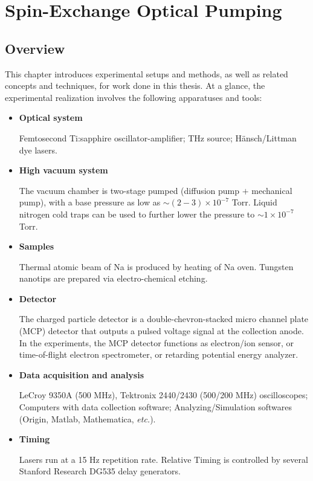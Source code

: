 \chapter{Spin-Exchange Optical Pumping}
\label{chap2}

\section{Overview}

This chapter introduces experimental setups and methods, as well as related concepts and techniques, for work done in this thesis. At a glance, the experimental realization involves the following apparatuses and tools:

\begin{itemize}[noitemsep,topsep=0pt]
	
    \item {\bf Optical system} 
    
    Femtosecond Ti:sapphire oscillator-amplifier; THz source; H\"{a}nsch/Littman dye lasers.
    
	\item {\bf High vacuum system}
	
	The vacuum chamber is two-stage pumped (diffusion pump $+$ mechanical pump), with a base pressure as low as $\sim (2-3) \times 10^{-7}$ Torr. Liquid nitrogen cold traps can be used to further lower the pressure to $\sim 1 \times 10^{-7}$ Torr. 
	
	\item {\bf Samples} 
	
	Thermal atomic beam of Na is produced by heating of Na oven. Tungsten nanotips are prepared via electro-chemical etching.
	
	\item {\bf Detector} 
	
	The charged particle detector is a double-chevron-stacked micro channel plate (MCP) detector that outputs a pulsed voltage signal at the collection anode. In the experiments, the MCP detector functions as electron/ion sensor, or time-of-flight electron spectrometer, or retarding potential energy analyzer.
	
	\item {\bf Data acquisition and analysis}
	
	LeCroy 9350A (500 MHz), Tektronix 2440/2430 (500/200 MHz) oscilloscopes; Computers with data collection software; Analyzing/Simulation softwares (Origin, Matlab, Mathematica, \emph{etc.\@}).
	
	\item {\bf Timing}
	
	Lasers run at a 15 Hz repetition rate. Relative Timing is controlled by several Stanford Research DG535 delay generators.
	
\end{itemize}

